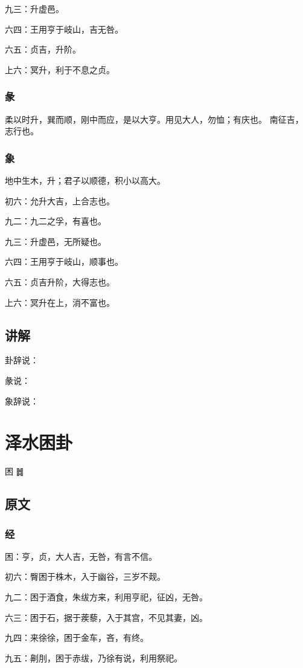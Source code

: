 \documentclass[12pt,oneside]{book}
\begin{document}
九三：升虚邑。

六四：王用亨于岐山，吉无咎。

六五：贞吉，升阶。

上六：冥升，利于不息之贞。


\subsection{彖}
柔以时升，巽而顺，刚中而应，是以大亨。用见大人，勿恤；有庆也。 南征吉，志行也。

\subsection{象}
地中生木，升；君子以顺德，积小以高大。

初六：允升大吉，上合志也。

九二：九二之孚，有喜也。

九三：升虚邑，无所疑也。

六四：王用亨于岐山，顺事也。

六五：贞吉升阶，大得志也。

上六：冥升在上，消不富也。

\section{讲解}
卦辞说：

彖说：

象辞说：

\chapter{泽水困卦}
困 {\Large ䷮}

\section{原文}

\subsection{经}
困：亨，贞，大人吉，无咎，有言不信。

初六：臀困于株木，入于幽谷，三岁不觌。

九二：困于酒食，朱绂方来，利用亨祀，征凶，无咎。

六三：困于石，据于蒺藜，入于其宫，不见其妻，凶。

九四：来徐徐，困于金车，吝，有终。

九五：劓刖，困于赤绂，乃徐有说，利用祭祀。
\end{document}
